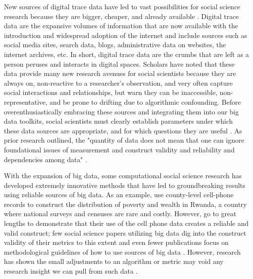 New sources of digital trace data have led to vast possibilities for social
science research because they are bigger, cheaper, and already available
\citep{kingEnsuringDataRichFuture2011,lazerComputationalSocialScience2009,salganikBitBitSocial2017}.
Digital trace data are the expansive volumes of information that are now
available with the introduction and widespread adoption of the internet and
include sources such as social media sites, search data, blogs, administrative
data on websites, the internet archives, etc. In short, digital trace data are
the crumbs that are left as a person peruses and interacts in digital spaces.
Scholars have noted that these data provide many new research avenues for social
scientists because they are always on, non-reactive to a researcher's
observation, and very often capture social interactions and relationships, but
warn they can be inaccessible, non-representative, and be prone to drifting due
to algorithmic confounding\citep{salganikBitBitSocial2017}. Before
overenthusiastically embracing these sources and integrating them into our big
data toolkits, social scientists must clearly establish parameters under which
these data sources are appropriate, and for which questions they are useful
\citep{bailCulturalEnvironmentMeasuring2014, lazerParableGoogleFlu2014}. As
prior research outlined, the "quantity of data does not mean that one can ignore
foundational issues of measurement and construct validity and reliability and
dependencies among data" \citep[p. 1203]{lazerParableGoogleFlu2014}.

With the expansion of big data, some computational social science research has
developed extremely innovative methods that have led to groundbreaking results
using reliable sources of big data. As an
example,\citet{blumenstockPredictingPovertyWealth2015} use county-level
cell-phone records to construct the distribution of poverty and wealth in
Rwanda, a country where national surveys and censuses are rare and costly.
However, \citet{blumenstockPredictingPovertyWealth2015} go to great lengths to
demonstrate that their use of the cell phone data creates a reliable and valid
construct; few social science papers utilizing big data dig into the construct
validity of their metrics to this extent and even fewer publications focus on
methodological guidelines of how to use sources of big data \citep[For
exceptions, see ][]{asseoTrackingCOVID19Using2020,
stilesAssessingCriterionValidity2018}. However, research has shown the small
adjustments to an algorithm or metric may void any research insight we can pull
from such data \citep{lazerParableGoogleFlu2014}.

